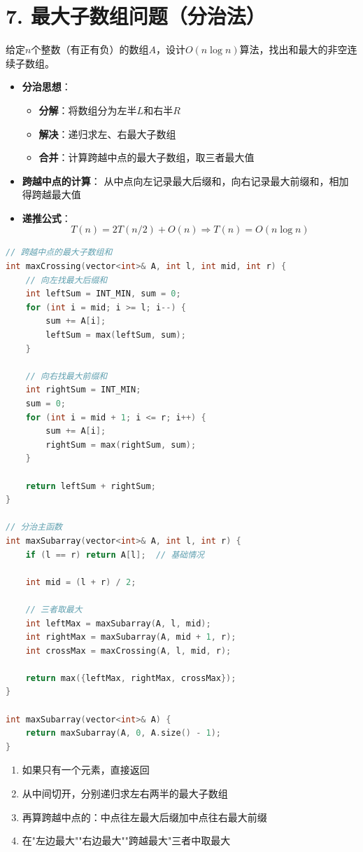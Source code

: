 \section*{7. 最大子数组问题（分治法）}

给定$n$个整数（有正有负）的数组$A$，设计$O(n \log n)$算法，找出和最大的非空连续子数组。

\begin{itemize}
    \item \textbf{分治思想}：
    \begin{itemize}
        \item \textbf{分解}：将数组分为左半$L$和右半$R$
        \item \textbf{解决}：递归求左、右最大子数组
        \item \textbf{合并}：计算跨越中点的最大子数组，取三者最大值
    \end{itemize}
    \item \textbf{跨越中点的计算}：
    从中点向左记录最大后缀和，向右记录最大前缀和，相加得跨越最大值
    \item \textbf{递推公式}：
    $$T(n) = 2T(n/2) + O(n) \Rightarrow T(n) = O(n \log n)$$
\end{itemize}

\begin{lstlisting}[language=C++, style=cppstyle]
// 跨越中点的最大子数组和
int maxCrossing(vector<int>& A, int l, int mid, int r) {
    // 向左找最大后缀和
    int leftSum = INT_MIN, sum = 0;
    for (int i = mid; i >= l; i--) {
        sum += A[i];
        leftSum = max(leftSum, sum);
    }

    // 向右找最大前缀和
    int rightSum = INT_MIN;
    sum = 0;
    for (int i = mid + 1; i <= r; i++) {
        sum += A[i];
        rightSum = max(rightSum, sum);
    }

    return leftSum + rightSum;
}

// 分治主函数
int maxSubarray(vector<int>& A, int l, int r) {
    if (l == r) return A[l];  // 基础情况

    int mid = (l + r) / 2;

    // 三者取最大
    int leftMax = maxSubarray(A, l, mid);
    int rightMax = maxSubarray(A, mid + 1, r);
    int crossMax = maxCrossing(A, l, mid, r);

    return max({leftMax, rightMax, crossMax});
}

int maxSubarray(vector<int>& A) {
    return maxSubarray(A, 0, A.size() - 1);
}
\end{lstlisting}

\begin{enumerate}
    \item 如果只有一个元素，直接返回
    \item 从中间切开，分别递归求左右两半的最大子数组
    \item 再算跨越中点的：中点往左最大后缀加中点往右最大前缀
    \item 在"左边最大""右边最大""跨越最大"三者中取最大
\end{enumerate}
